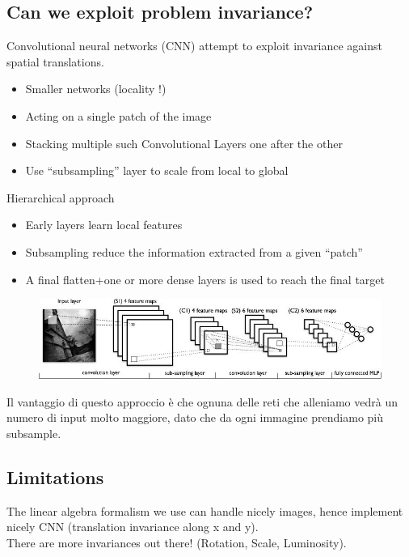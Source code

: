\subsection{Can we exploit problem invariance?}

Convolutional neural networks (CNN) attempt to exploit invariance against spatial translations.
\begin{itemize}
	\item Smaller networks (locality !)
	\item Acting on a single patch of the image
	\item Stacking multiple such Convolutional Layers one after the other
	\item Use “subsampling” layer to scale from local to global
\end{itemize}

Hierarchical approach

\begin{itemize}
	\item Early layers learn local features
	\item Subsampling reduce the information extracted from a given “patch”
	\item A final flatten+one or more dense layers is used to reach the final target
\end{itemize}

\begin{figure}[ht]
	\centering
	\includegraphics[width=0.8\linewidth]{figure_ml/cnn.png}
\end{figure}
\FloatBarrier

Il vantaggio di questo approccio è che ognuna delle reti che alleniamo vedrà un numero di input molto maggiore, dato che da ogni immagine prendiamo più subsample.


\subsection{Limitations}

The linear algebra formalism we use can handle nicely images, hence implement nicely CNN (translation invariance along x and y).\\

There are more invariances out there! (Rotation, Scale, Luminosity).\\

